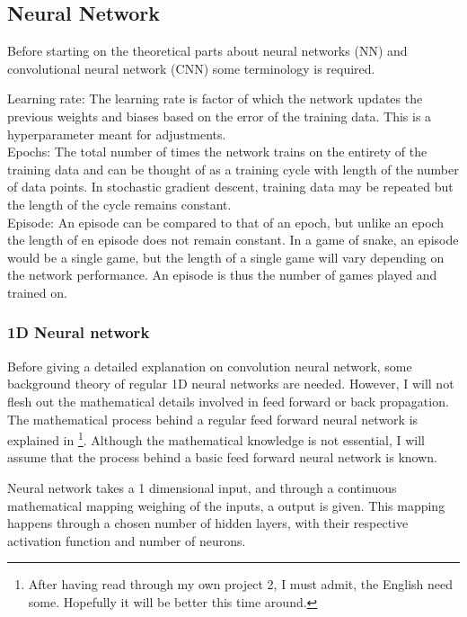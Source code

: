 \documentclass[%
 uio,
 jmp,
 amsmath,amssymb,
 reprint, nofootinbib]{revtex4-1}
\numberwithin{equation}{section}
\begin{document}
\subsection{Neural Network}

Before starting on the theoretical parts about neural networks (NN) and convolutional neural network (CNN) some terminology is required.

Learning rate: The learning rate is factor of which the network updates the previous weights and biases based on the error of the training data. This is a hyperparameter meant for adjustments.\\

Epochs: The total number of times the network trains on the entirety of the training data and can be thought of as a training cycle with length of the number of data points. In stochastic gradient descent, training data may be repeated but the length of the cycle remains constant.\\

Episode: An episode can be compared to that of an epoch, but unlike an epoch the length of en episode does not remain constant. In a game of snake, an episode would be a single game, but the length of a single game will vary depending on the network performance. An episode is thus the number of games played and trained on.

\subsubsection{1D Neural network}

Before giving a detailed explanation on convolution neural network, some background theory of regular 1D neural networks are needed. However, I will not flesh out the mathematical details involved in feed forward or back propagation. The mathematical process behind a regular feed forward neural network is explained in \cite{Project2}\footnote{After having read through my own project 2, I must admit, the English need some. Hopefully it will be better this time around.}. Although the mathematical knowledge is not essential, I will assume that the process behind a basic feed forward neural network is known. 

Neural network takes a 1 dimensional input, and through a continuous mathematical mapping weighing of the inputs, a output is given. This mapping happens through a chosen number of hidden layers, with their respective activation function and number of neurons.
\end{document}
